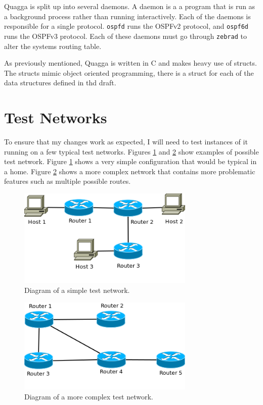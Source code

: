 \documentclass[12pt]{report}
\begin{document}
Quagga is split up into several daemons. A daemon is a a program that is run as
a background process rather than running interactively. Each of the daemons is
responsible for a single protocol. \texttt{ospfd} runs the OSPFv2 protocol, and
\texttt{ospf6d} runs the OSPFv3 protocol. Each of these daemons must go through 
\texttt{zebrad} to alter the systems routing table. 

As previously mentioned, Quagga is written in C and makes heavy use of
structs. The structs mimic object oriented programming, there is a struct for
each of the data structures defined in thd draft. 

\section{Test Networks}
To ensure that my changes work as expected, I will need to test instances of it
running on a few typical test networks. Figures \ref{fig:SimpleTestNet} and
\ref{fig:ComplexTestNet} show examples of possible test network. Figure
\ref{fig:SimpleTestNet} shows a very simple configuration that would be typical
in a home. Figure \ref{fig:ComplexTestNet} shows a more complex network that
contains more problematic features such as multiple possible routes. 

\begin{figure}
\centering
\includegraphics[width=0.75\textwidth]{../Diagrams/Network/SimpleTestNet.png}
\caption{Diagram of a simple test network.}
\label{fig:SimpleTestNet}
\end{figure}


\begin{figure}
\centering
\includegraphics[width=0.75\textwidth]{../Diagrams/Network/ComplexTestNet.png}
\caption{Diagram of a more complex test network.}
\label{fig:ComplexTestNet}
\end{figure}
\end{document}
